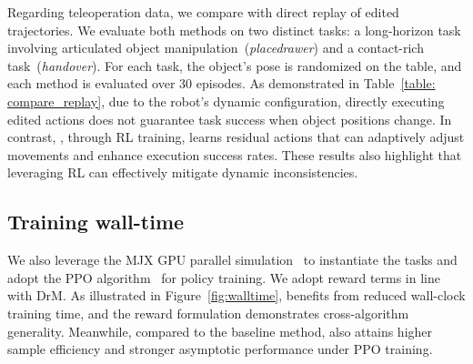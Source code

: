 \begin{table}[h]
\centering
\caption{Comparison of \ourshort and replay edited trajectories.}
\label{table: compare_replay}
\end{table}

Regarding teleoperation data, we compare \ourshort with direct replay of edited trajectories. We evaluate both methods on two distinct tasks: a long-horizon task involving articulated object manipulation~(\textit{placedrawer}) and a contact-rich task~(\textit{handover}). For each task, the object's pose is randomized on the table, and each method is evaluated over 30 episodes. As demonstrated in Table~\ref{table: compare_replay}, due to the robot's dynamic configuration, directly executing edited actions does not guarantee task success when object positions change. In contrast, \ourshort, through RL training, learns residual actions that can adaptively adjust movements and enhance execution success rates. These results also highlight that \ourshort leveraging RL can effectively mitigate dynamic inconsistencies. 


\subsection{Training wall-time}
We also leverage the MJX GPU parallel simulation~\cite{MJX} to instantiate the tasks and adopt the PPO algorithm~\cite{schulman2017proximal} for policy training. We adopt reward terms in line with DrM. As illustrated in Figure~\ref{fig:walltime}, \ourshort benefits from reduced wall-clock training time, and the reward formulation demonstrates cross-algorithm generality. Meanwhile, compared to the baseline method, \ourshort also attains higher sample efficiency and stronger asymptotic performance under PPO training.

